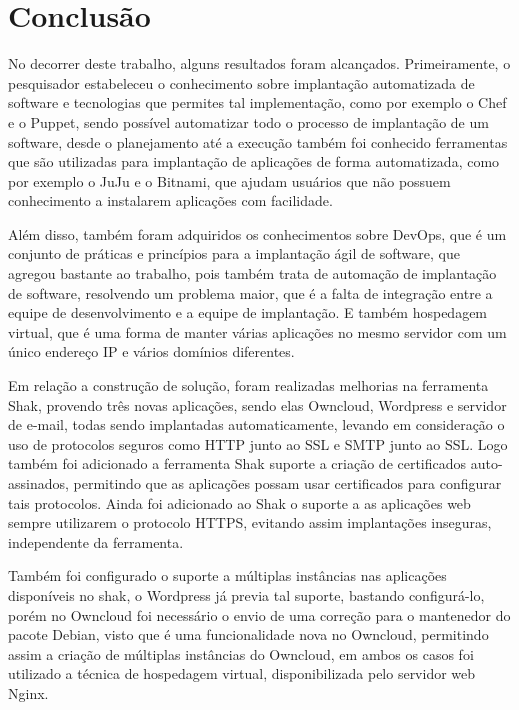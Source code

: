 \chapter{Conclusão}
\label{cap-conclusoes}

No decorrer deste trabalho, alguns resultados foram alcançados. Primeiramente, o
pesquisador estabeleceu o conhecimento sobre implantação automatizada
de software e tecnologias que permites tal implementação, como por exemplo o Chef
e o Puppet, sendo possível automatizar todo o processo de implantação de um software,
desde o planejamento até a execução também foi conhecido ferramentas que são
utilizadas para implantação de aplicações de forma automatizada, como por exemplo
o JuJu e o Bitnami, que ajudam usuários que não possuem conhecimento a
instalarem aplicações com facilidade.

Além disso, também foram adquiridos os conhecimentos sobre DevOps, que é um conjunto
de práticas e princípios para a implantação ágil de software, que agregou bastante
ao trabalho, pois também trata de automação de implantação de software, resolvendo
um problema maior, que é a falta de integração entre a equipe de desenvolvimento
e a equipe de implantação. E também hospedagem virtual, que é uma forma de manter
várias aplicações no mesmo servidor com um único endereço IP e vários domínios diferentes.

Em relação a construção de solução, foram realizadas melhorias na ferramenta Shak,
provendo três novas aplicações, sendo elas Owncloud, Wordpress e servidor de e-mail,
todas sendo implantadas automaticamente, levando em consideração o uso de protocolos
seguros como HTTP junto ao SSL e SMTP junto ao SSL. Logo também foi adicionado a
ferramenta Shak suporte a criação de certificados auto-assinados, permitindo que
as aplicações possam usar certificados para configurar tais protocolos. Ainda foi
adicionado ao Shak o suporte a as aplicações web sempre utilizarem
o protocolo HTTPS, evitando assim implantações inseguras, independente da ferramenta.

Também foi configurado o suporte a múltiplas instâncias nas aplicações disponíveis
no shak, o Wordpress já previa tal suporte, bastando configurá-lo, porém no Owncloud
foi necessário o envio de uma correção para o mantenedor do pacote Debian, visto que
é uma funcionalidade nova no Owncloud, permitindo assim a criação de múltiplas
instâncias do Owncloud, em ambos os casos foi utilizado a técnica de hospedagem
virtual, disponibilizada pelo servidor web Nginx.


